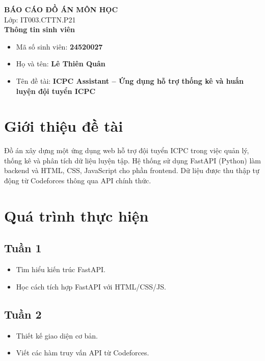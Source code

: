 \documentclass[12pt,a4paper]{article}
\begin{document}
	
	\begin{center}
		\Large\textbf{BÁO CÁO ĐỒ ÁN MÔN HỌC} \\
		\vspace{0.5em}
		\normalsize Lớp: IT003.CTTN.P21 \\
		\vspace{2em}
		\textbf{Thông tin sinh viên} \\
	\end{center}
	
	\begin{itemize}
		\item Mã số sinh viên: \textbf{24520027}
		\item Họ và tên: \textbf{Lê Thiên Quân}
		\item Tên đề tài: \textbf{ICPC Assistant – Ứng dụng hỗ trợ thống kê và huấn luyện đội tuyển ICPC}
	\end{itemize}
	
	\vspace{1em}
	
	\section{Giới thiệu đề tài}
	
	Đồ án xây dựng một ứng dụng web hỗ trợ đội tuyển ICPC trong việc quản lý, thống kê và phân tích dữ liệu luyện tập. Hệ thống sử dụng FastAPI (Python) làm backend và HTML, CSS, JavaScript cho phần frontend. Dữ liệu được thu thập tự động từ Codeforces thông qua API chính thức.
	
	\section{Quá trình thực hiện}
	
	\subsection*{Tuần 1}
	\begin{itemize}
		\item Tìm hiểu kiến trúc FastAPI.
		\item Học cách tích hợp FastAPI với HTML/CSS/JS.
	\end{itemize}
	
	\subsection*{Tuần 2}
	\begin{itemize}
		\item Thiết kế giao diện cơ bản.
		\item Viết các hàm truy vấn API từ Codeforces.
	\end{itemize}
	
\end{document}
